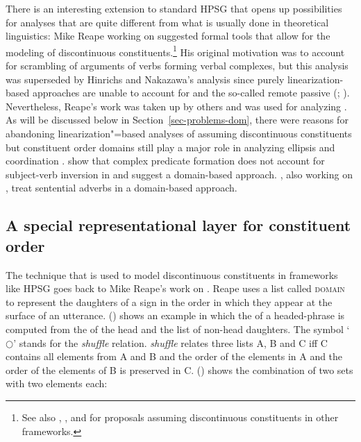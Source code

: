 \documentclass[output=paper
                ,modfonts
                ,nonflat
	        ,collection
	        ,collectionchapter
	        ,collectiontoclongg
 	        ,biblatex
                ,babelshorthands
                ,newtxmath
                ,draftmode
                ,colorlinks, citecolor=brown
]{./langsci/langscibook}
\begin{document}
There is an interesting extension to standard HPSG that opens up possibilities for analyses that are
quite different from what is usually done in theoretical linguistics: Mike Reape
\citeyearpar{Reape91,Reape92a,Reape94a} working on  suggested formal tools that allow for the
modeling of discontinuous constituents.\footnote{
  See also , , and  for proposals assuming discontinuous constituents in other frameworks.%
} His original motivation was to account for scrambling of arguments of verbs forming
verbal complexes, but this analysis was superseded by Hinrichs and Nakazawa's analysis
\citep{HN89a,HN94a} since purely linearization-based approaches are unable to account for 
and the so-called remote passive (\citealp[Section~5.1, Section~5.2]{Kathol98b};
\citealp[Chapter~21.1]{Mueller99a}). Nevertheless, Reape's work was taken up by others and was used for analyzing 
\citep{KP95a,Kathol2000a,Mueller95c,Babel,Mueller2004b,Wetta2011a,Wetta2014a-u}. As will be
discussed below in Section~\ref{sec-problems-dom}, there were reasons for abandoning
linearization"=based analyses of  assuming discontinuous constituents
\parencites{Mueller2005d}[Chapter~6]{MuellerGS} but constituent order
domains still play a major role in analyzing ellipsis  and
coordination \crossrefchapterp[\page
  \pageref{page-linearization-domains-in-coordination-one}, \pageref{page-linearization-domains-in-coordination-two}]{coordination}.  \citet*{BGM99a} show that complex
predicate formation does not account for subject-verb inversion in  and suggest a
domain-based approach. \citet{BG2007b-u}, also working on , treat sentential adverbs in
a domain-based approach.

\subsection{A special representational layer for constituent order}

The technique that is used to model discontinuous constituents in frameworks like HPSG goes back to Mike Reape's work on 
\citeyearpar{Reape91,Reape92a,Reape94a}. 
Reape uses a list called \textsc{domain} to represent the daughters of a sign in the order in
which they appear at the surface of an utterance. () shows an example in which the \domv of a
headed-phrase is computed from the \domv of the head and the list of non-head daughters.
\ea
\label{ex-shuffeling-daughters}
 \impl
{}
\z
The symbol `$\bigcirc$'\is{$\bigcirc$}\label{rel-shuffle}
stands for the \emph{shuffle} relation. \emph{shuffle} relates three lists A, B and C iff C
contains all elements from A and B and the order of the elements in A and the order of the elements
of B is preserved in C. () shows the combination of two sets with two elements each:
\end{document}
